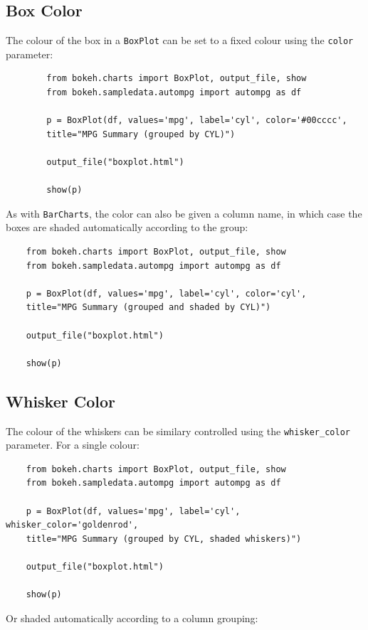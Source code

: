 \documentclass[12pt, a4paper]{report}
\begin{document}
\subsection*{Box Color}
The colour of the box in a \texttt{BoxPlot} can be set to a fixed colour using the \texttt{color} parameter:
{
	\large
	\begin{framed}
		\begin{verbatim}
		from bokeh.charts import BoxPlot, output_file, show
		from bokeh.sampledata.autompg import autompg as df
		
		p = BoxPlot(df, values='mpg', label='cyl', color='#00cccc',
		title="MPG Summary (grouped by CYL)")
		
		output_file("boxplot.html")
		
		show(p)
		\end{verbatim}
	\end{framed}
}
\newpage
\noindent As with \texttt{BarCharts}, the color can also be given a column name, in which case the boxes are shaded automatically according to the group:\\

\bigskip
{
	\large
	\begin{verbatim}
	from bokeh.charts import BoxPlot, output_file, show
	from bokeh.sampledata.autompg import autompg as df
	
	p = BoxPlot(df, values='mpg', label='cyl', color='cyl',
	title="MPG Summary (grouped and shaded by CYL)")
	
	output_file("boxplot.html")
	
	show(p)
	\end{verbatim}
}
\newpage
\subsection*{Whisker Color}
The colour of the whiskers can be similary controlled using the \texttt{whisker\_color} parameter. For a single colour:
{
	\large
	\begin{framed}
	\begin{verbatim}
	from bokeh.charts import BoxPlot, output_file, show
	from bokeh.sampledata.autompg import autompg as df
	
	p = BoxPlot(df, values='mpg', label='cyl', whisker_color='goldenrod',
	title="MPG Summary (grouped by CYL, shaded whiskers)")
	
	output_file("boxplot.html")
	
	show(p)
	\end{verbatim}
	\end{framed}
}
\bigskip
\noindent Or shaded automatically according to a column grouping:\\
\end{document}
